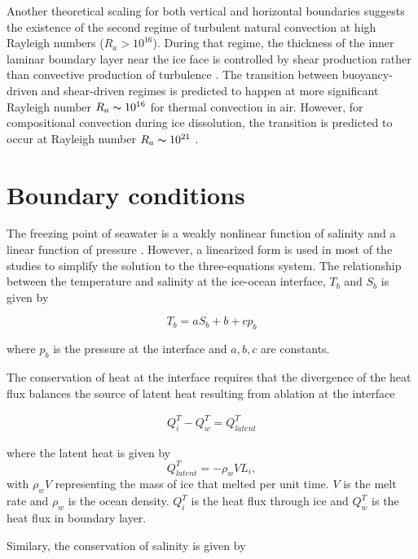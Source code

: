 \documentclass[11pt,a4paper]{article}
\begin{document}
	Another theoretical scaling for both vertical and horizontal boundaries suggests the existence of the second regime of turbulent natural convection at high Rayleigh numbers ($R_a> 10^{16}$). During that regime, the thickness of the inner laminar boundary layer near the ice face is controlled by shear production rather than convective production of turbulence \citep{grossmann2000scaling, wells2008geophysical,kerr2015dissolution,gayen2016simulation}. The transition between buoyancy-driven and shear-driven regimes is predicted to happen at more significant Rayleigh number $R_a \thicksim 10^{16}$ for thermal convection in air. However, for compositional convection during ice dissolution, the transition is predicted to occur at Rayleigh number $R_a \thicksim 10^{21}$ \citep{kerr2015dissolution,gayen2016simulation}.

    \section{Boundary conditions}
    
    	The freezing point of seawater is a weakly nonlinear function of salinity and a linear function of pressure \citep{millero1978freezing}. However, a linearized form is used in most of the studies to simplify the solution to the three-equations system. The relationship between the temperature and salinity at the ice-ocean interface, $T_b$ and $S_b$ is given by
		
		\begin{equation}
			\label{eq:1}
			T_b = aS_b+b+cp_b
		\end{equation}
		
		where $p_b$ is the pressure at the interface and $a,b,c$ are constants.
		
		The conservation of heat at the interface requires that the divergence of the heat flux balances the source of latent heat resulting from ablation at the interface
		
		\begin{eqnarray}
			\label{eq:2}
			Q_i^T - Q_w^T = Q_{latent}^T
		\end{eqnarray}
		
		where the latent heat is given by $$Q_{latent}^T = -\rho_wVL_i,$$ with $\rho_wV$ representing the mass of ice that melted per unit time. $V$ is the melt rate and $\rho_w$ is the ocean density. $Q_i^T$ is the heat flux through ice and $ Q_w^T$ is the heat flux in boundary layer.
		
		Similary, the conservation of salinity is given by
		
\end{document}
